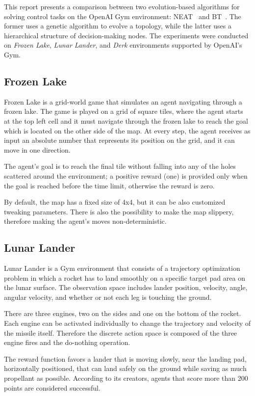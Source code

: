 This report presents a comparison between two evolution-based algorithms for solving control tasks on the OpenAI Gym environment: NEAT~\cite{NEAT} and BT~\cite{BT}. The former uses a genetic algorithm to evolve a topology, while the latter uses a hierarchical structure of decision-making nodes. The experiments were conducted on \textit{Frozen Lake}, \textit{Lunar Lander}, and \textit{Derk} environments supported by OpenAI's Gym.

\subsection{Frozen Lake}
Frozen Lake is a grid-world game that simulates an agent navigating through a frozen lake. The game is played on a grid of square tiles, where the agent starts at the top left cell and it must navigate through the frozen lake to reach the goal which is located on the other side of the map. At every step, the agent receives as input an absolute number that represents its position on the grid, and it can move in one direction.

The agent's goal is to reach the final tile without falling into any of the holes scattered around the environment; a positive reward (one) is provided only when the goal is reached before the time limit, otherwise the reward is zero. 

By default, the map has a fixed size of 4x4, but it can be also customized tweaking parameters. There is also the possibility to make the map slippery, therefore making the agent's moves non-deterministic.

\subsection{Lunar Lander}
Lunar Lander is a Gym environment that consists of a trajectory optimization problem in which a rocket has to land smoothly on a specific target pad area on the lunar surface. The observation space includes lander position, velocity, angle, angular velocity, and whether or not each leg is touching the ground.

There are three engines, two on the sides and one on the bottom of the rocket. Each engine can be activated individually to change the trajectory and velocity of the missile itself. Therefore the discrete action space is composed of the three engine fires and the do-nothing operation.

The reward function favors a lander that is moving slowly, near the landing pad, horizontally positioned, that can land safely on the ground while saving as much propellant as possible. According to its creators, agents that score more than 200 points are considered successful.


